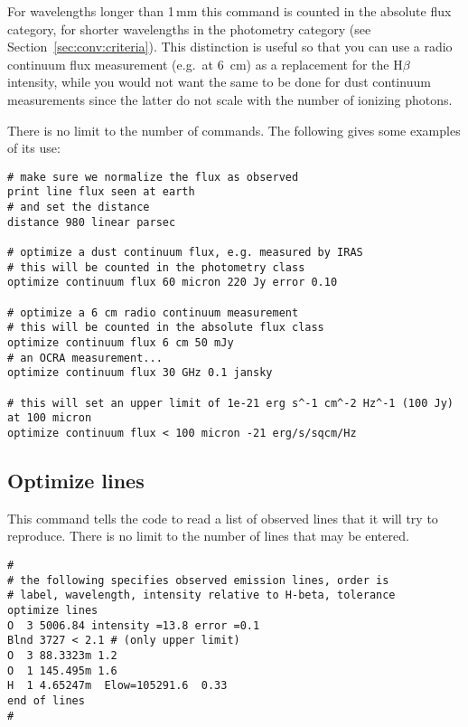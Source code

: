 For wavelengths longer than 1\,mm this command is counted in the
absolute flux category, for shorter wavelengths in the photometry category (see
Section~\ref{sec:conv:criteria}). This distinction is useful so that you can
use a radio continuum flux measurement (e.g.\ at 6~cm) as a replacement for
the H$\beta$ intensity, while you would not want the same to be done for dust
continuum measurements since the latter do not scale with the number of
ionizing photons.

There is no limit to the number of 
commands. The following gives some examples of its use:
\begin{verbatim}
# make sure we normalize the flux as observed
print line flux seen at earth
# and set the distance
distance 980 linear parsec

# optimize a dust continuum flux, e.g. measured by IRAS
# this will be counted in the photometry class
optimize continuum flux 60 micron 220 Jy error 0.10

# optimize a 6 cm radio continuum measurement
# this will be counted in the absolute flux class
optimize continuum flux 6 cm 50 mJy
# an OCRA measurement...
optimize continuum flux 30 GHz 0.1 jansky

# this will set an upper limit of 1e-21 erg s^-1 cm^-2 Hz^-1 (100 Jy) at 100 micron
optimize continuum flux < 100 micron -21 erg/s/sqcm/Hz
\end{verbatim}

\subsection{Optimize lines}

This command tells the code to read a list of observed lines that it
will try to reproduce.
There is no limit to the number of lines that may be entered.
\begin{verbatim}
#
# the following specifies observed emission lines, order is
# label, wavelength, intensity relative to H-beta, tolerance
optimize lines
O  3 5006.84 intensity =13.8 error =0.1
Blnd 3727 < 2.1 # (only upper limit)
O  3 88.3323m 1.2
O  1 145.495m 1.6
H  1 4.65247m  Elow=105291.6  0.33
end of lines
#
\end{verbatim}

